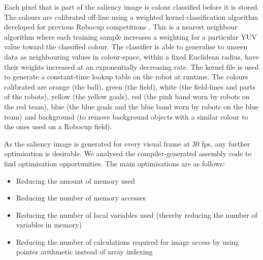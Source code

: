 \documentclass[runningheads,a4paper]{llncs}
\begin{document}
Each pixel that is part of the saliency image is colour classified before it is stored. The colours
are calibrated off-line using a weighted kernel classification algorithm
developed for previous Robocup competitions \cite{kimcuongpham}. This is a
nearest neighbour algorithm where each training sample increases a weighting for
a particular YUV value toward the classified colour. The classifier is able to
generalise to unseen data as neighbouring values in colour-space, within a fixed
Euclidean radius, have their weights increased at an exponentially decreasing
rate. The kernel file is used to generate a constant-time lookup table on the
robot at runtime. The colours calibrated are orange (the ball), green (the
field), white (the field-lines and parts of the robots), yellow (the yellow
goals), red (the pink band worn by robots on the red team), blue (the blue
goals and the blue band worn by robots on the blue team) and background (to remove background objects with a similar colour to the ones used on a Robocup field).

As the saliency image is generated for every visual frame at 30 fps, any further
optimisation is desirable. We analysed the compiler-generated assembly code to
find optimisation opportunities. The main optimisations are as follows: 

\begin{itemize}
  \item Reducing the amount of memory used
  \item Reducing the number of memory accesses
  \item Reducing the number of local variables used (thereby reducing the
number of variables in memory)
  \item Reducing the number of calculations required for image access by using
pointer arithmetic instead of array indexing
\end{itemize}

\end{document}
